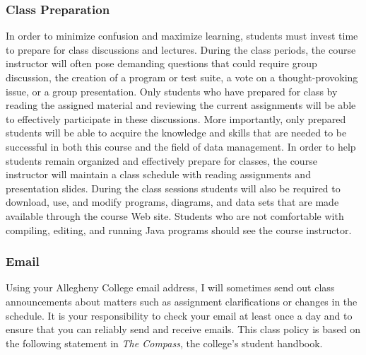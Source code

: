 \subsubsection*{Class Preparation}

% 

In order to minimize confusion and maximize learning, students must invest time to prepare for class discussions and
lectures.  During the class periods, the course instructor will often pose demanding questions that could require group
discussion, the creation of a program or test suite, a vote on a thought-provoking issue, or a group presentation.  Only
students who have prepared for class by reading the assigned material and reviewing the current assignments will be able
to effectively participate in these discussions.  More importantly, only prepared students will be able to acquire the
knowledge and skills that are needed to be successful in both this course and the field of data management.  In order to
help students remain organized and effectively prepare for classes, the course instructor will maintain a class schedule
with reading assignments and presentation slides.   During the class sessions students will also be required to
download, use, and modify programs, diagrams, and data sets that are made available through the course Web site.
Students who are not comfortable with compiling, editing, and running Java programs should see the course instructor.

\subsubsection*{Email}

Using your Allegheny College email address, I will sometimes send out class announcements about matters such as
assignment clarifications or changes in the schedule. It is your responsibility to check your email at least once a day
and to ensure that you can reliably send and receive emails. This class policy is based on the following statement in
{\em The Compass}, the college's student handbook.

